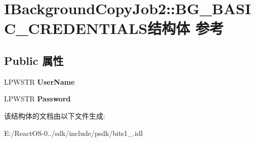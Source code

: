 \hypertarget{struct_i_background_copy_job2_1_1_b_g___b_a_s_i_c___c_r_e_d_e_n_t_i_a_l_s}{}\section{I\+Background\+Copy\+Job2\+:\+:B\+G\+\_\+\+B\+A\+S\+I\+C\+\_\+\+C\+R\+E\+D\+E\+N\+T\+I\+A\+L\+S结构体 参考}
\label{struct_i_background_copy_job2_1_1_b_g___b_a_s_i_c___c_r_e_d_e_n_t_i_a_l_s}
\subsection*{Public 属性}
\begin{DoxyCompactItemize}
\item 
\mbox{\label{struct_i_background_copy_job2_1_1_b_g___b_a_s_i_c___c_r_e_d_e_n_t_i_a_l_s_a19e3dfe1eac940240dc382b39d323607}} 
L\+P\+W\+S\+TR {\bfseries User\+Name}
\item 
\mbox{\label{struct_i_background_copy_job2_1_1_b_g___b_a_s_i_c___c_r_e_d_e_n_t_i_a_l_s_a97618e9f9d44c021cec3d172004a2bdc}} 
L\+P\+W\+S\+TR {\bfseries Password}
\end{DoxyCompactItemize}


该结构体的文档由以下文件生成\+:\begin{DoxyCompactItemize}
\item 
E\+:/\+React\+O\+S-\/0../sdk/include/psdk/bits1\+\_.\+idl\end{DoxyCompactItemize}
